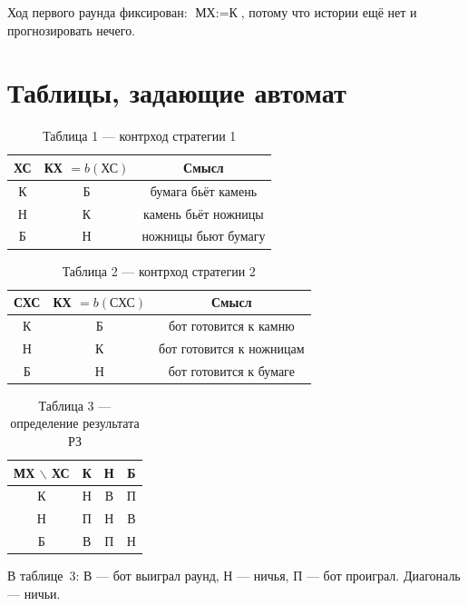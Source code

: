 \documentclass[a4paper,14pt]{extarticle}
\begin{document}
Ход первого раунда фиксирован: $\text{МХ}:=\text{К}$, потому что истории ещё
нет и прогнозировать нечего.

\section{Таблицы, задающие автомат}

\begin{table}[H]
\centering
\caption{Таблица 1 --- контрход стратегии 1}
\label{tab:t1}
\begin{tabular}{|c|c|c|}
\hline
\textbf{ХС} & \textbf{КХ $=b(\text{ХС})$} & \textbf{Смысл}\\
\hline
К & Б & бумага бьёт камень\\
\hline
Н & К & камень бьёт ножницы\\
\hline
Б & Н & ножницы бьют бумагу\\
\hline
\end{tabular}
\end{table}

\begin{table}[H]
\centering
\caption{Таблица 2 --- контрход стратегии 2}
\label{tab:t2}
\begin{tabular}{|c|c|c|}
\hline
\textbf{СХС} & \textbf{КХ $=b(\text{СХС})$} & \textbf{Смысл}\\
\hline
К & Б & бот готовится к камню\\
\hline
Н & К & бот готовится к ножницам\\
\hline
Б & Н & бот готовится к бумаге\\
\hline
\end{tabular}
\end{table}

\begin{table}[H]
\centering
\caption{Таблица 3 --- определение результата РЗ}
\label{tab:t3}
\begin{tabular}{|c||c|c|c|}
\hline
\textbf{МХ $\backslash$ ХС} & \textbf{К} & \textbf{Н} & \textbf{Б}\\
\hline\hline
К & Н & В & П\\
\hline
Н & П & Н & В\\
\hline
Б & В & П & Н\\
\hline
\end{tabular}
\end{table}

В таблице~3: В --- бот выиграл раунд, Н --- ничья, П --- бот проиграл.
Диагональ --- ничьи.
\end{document}
